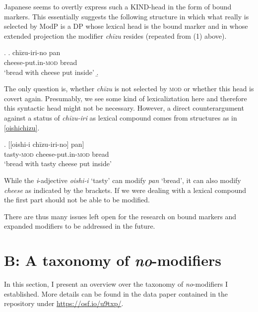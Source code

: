 \documentclass [output=book,colorlinks,citecolor=brown]{langscibook}
\begin{document}
Japanese seems to overtly express such a KIND-head in the form of bound markers. This essentially suggests the following structure in which what really is selected by ModP is a DP whose lexical head is the bound marker and in whose extended projection the modifier \textit{chīzu} resides (repeated from (1) above).

\ex. \ag. chīzu-iri-no pan\\
cheese-put.in-\textsc{mod} bread\\
`bread with cheese put inside'
\b. 

The only question is, whether \textit{chīzu} is not selected by \textsc{mod} or whether this head is covert again. Presumably, we see some kind of lexicaliztation here and therefore this syntactic head might not be necessary. However, a direct counterargument against a status of \textit{chīzu-iri} as lexical compound comes from structures as in \ref{oishichizu}. %

\exg. [[oishi-i chīzu-iri-no] pan]\\
tasty-\textsc{mod} cheese-put.in-\textsc{mod} bread\\
`bread with tasty cheese put inside' \label{oishichizu}

While the \textit{i}-adjective \textit{oishi-i} `tasty’ can modify \textit{pan} `bread’, it can also modify \textit{cheese} as indicated by the brackets. If we were dealing with a lexical compound the first part should not be able to be modified.

There are thus many issues left open for the research on bound markers and expanded modifiers to be addressed in the future.

\section*{B: A taxonomy of \textit{no}-modifiers}

In this section, I present an overview over the taxonomy of \textit{no}-modifiers I established. More details can be found in the data paper contained in the repository under \url{https://osf.io/u9txp/}.
\end{document}
